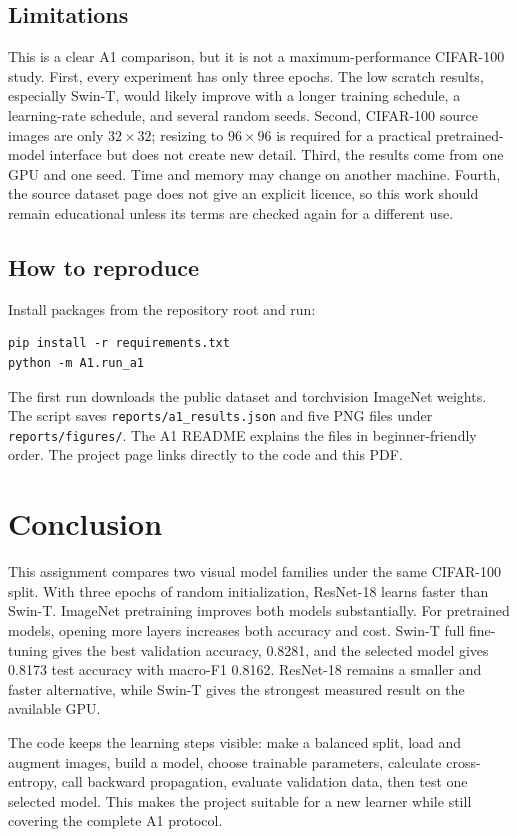 \documentclass[oneside]{hcmut-report}
\begin{document}
\subsection{Limitations}
This is a clear A1 comparison, but it is not a maximum-performance CIFAR-100 study. First, every experiment has only three epochs. The low scratch results, especially Swin-T, would likely improve with a longer training schedule, a learning-rate schedule, and several random seeds. Second, CIFAR-100 source images are only $32\times32$; resizing to $96\times96$ is required for a practical pretrained-model interface but does not create new detail. Third, the results come from one GPU and one seed. Time and memory may change on another machine. Fourth, the source dataset page does not give an explicit licence, so this work should remain educational unless its terms are checked again for a different use.

\subsection{How to reproduce}
Install packages from the repository root and run:
\begin{verbatim}
pip install -r requirements.txt
python -m A1.run_a1
\end{verbatim}
The first run downloads the public dataset and torchvision ImageNet weights. The script saves \texttt{reports/a1\_results.json} and five PNG files under \texttt{reports/figures/}. The A1 README explains the files in beginner-friendly order. The project page links directly to the code and this PDF.

\section{Conclusion}
This assignment compares two visual model families under the same CIFAR-100 split. With three epochs of random initialization, ResNet-18 learns faster than Swin-T. ImageNet pretraining improves both models substantially. For pretrained models, opening more layers increases both accuracy and cost. Swin-T full fine-tuning gives the best validation accuracy, 0.8281, and the selected model gives 0.8173 test accuracy with macro-F1 0.8162. ResNet-18 remains a smaller and faster alternative, while Swin-T gives the strongest measured result on the available GPU.

The code keeps the learning steps visible: make a balanced split, load and augment images, build a model, choose trainable parameters, calculate cross-entropy, call backward propagation, evaluate validation data, then test one selected model. This makes the project suitable for a new learner while still covering the complete A1 protocol.
\end{document}
